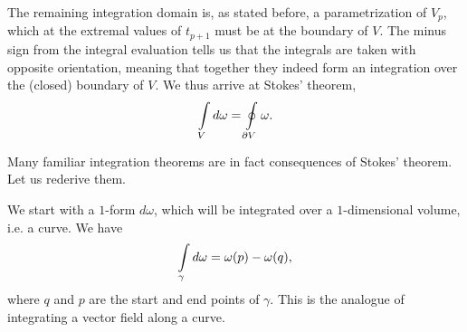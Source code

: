 The remaining integration domain is, as stated before, a parametrization of $V_{p}$, which at the extremal values of $t_{p + 1}$ must be at the boundary of $V$. The minus sign from the integral evaluation tells us that the integrals are taken with opposite orientation, meaning that together they indeed form an integration over the (closed) boundary of $V$. We thus arrive at Stokes' theorem,
\begin{align*}
	\int\limits_{V}d\omega = \oint\limits_{\partial V}\omega.
\end{align*}

Many familiar integration theorems are in fact consequences of Stokes' theorem. Let us rederive them.

We start with a $1$-form $d\omega$, which will be integrated over a $1$-dimensional volume, i.e. a curve. We have
\begin{align*}
	\int\limits_{\gamma}d\omega = \omega(p) - \omega(q),
\end{align*}
where $q$ and $p$ are the start and end points of $\gamma$. This is the analogue of integrating a vector field along a curve.

